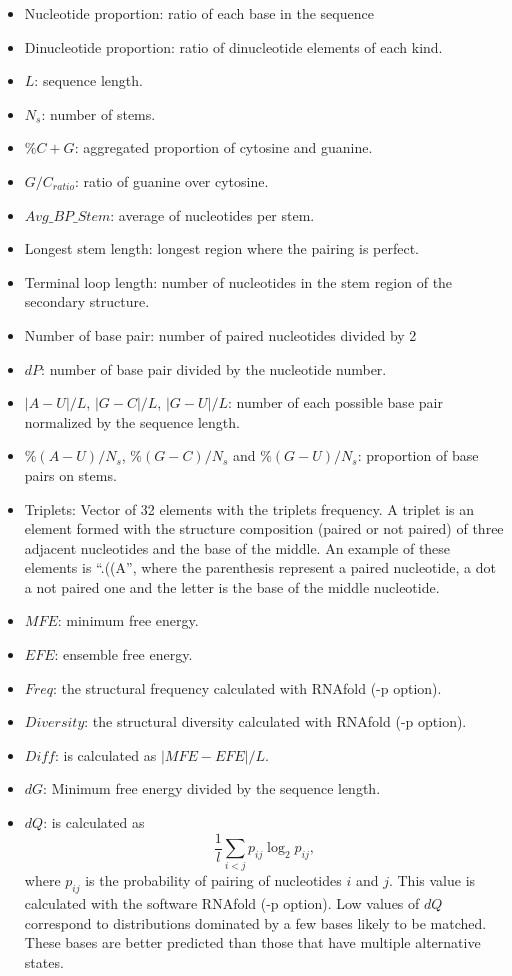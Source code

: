 \documentclass[]{scrartcl}
\begin{document}
\begin{itemize}
	\item Nucleotide proportion: ratio of each base in the sequence
	\item Dinucleotide proportion: ratio of dinucleotide elements of each kind.
	\item $L$: sequence length.
	\item $N_{s}$: number of stems.
	\item $\%C + G$: aggregated proportion of cytosine and guanine.
	\item $G/C_{ratio}$: ratio of guanine over cytosine.
	\item $Avg\_BP\_Stem$: average of nucleotides per stem.
	\item Longest stem length: longest region where the pairing is perfect.
	\item Terminal loop length: number of nucleotides in the stem region of the secondary structure.
	\item Number of base pair: number of paired nucleotides divided by 2
	\item $dP$: number of base pair divided by the nucleotide number.
	\item $|A-U|/L$, $|G-C|/L$, $|G-U|/L$: number of each possible base pair normalized by the sequence length.
	\item $\%(A-U)/N_{s}$, $\%(G-C)/N_{s}$ and $\%(G-U)/N_{s}$: proportion of base pairs on stems.
	\item Triplets: Vector of 32 elements with the triplets frequency. A triplet is an element formed with the structure composition (paired or not paired) of three adjacent nucleotides and the base of the middle. An example of these elements is \textquotedblleft.((A\textquotedblright, where the parenthesis represent a paired nucleotide, a dot a not paired one and the letter is the base of the middle nucleotide.
	\item $MFE$: minimum free energy.
	\item $EFE$: ensemble free energy.
	\item $Freq$: the structural frequency calculated with RNAfold (-p option).
	\item $Diversity$: the structural diversity calculated with RNAfold (-p option).
	\item $Diff$: is calculated as $|MFE-EFE|/L$.
	\item $dG$: Minimum free energy divided by the sequence length.
	\item $dQ$: is calculated as $$\frac{1}{l} \sum_{i<j} p_{ij} \log_2 p_{ij} , $$	where $p_{ij}$ is the probability of pairing of nucleotides $i$ and $j$. This value is calculated with the software RNAfold (-p option). Low values of $dQ$ correspond to distributions dominated by a few bases likely to be matched. These bases are better predicted than those that have multiple alternative states.

\end{itemize}
\end{document}
